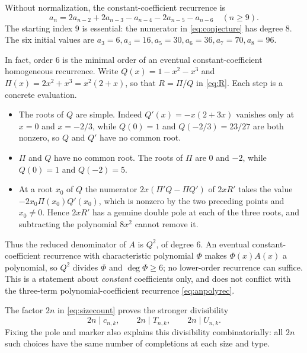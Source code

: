 \documentclass[11pt,letterpaper]{article}
\numberwithin{equation}{section}
\theoremstyle{definition}
\newcommand{\1}{\mathbf 1}
\begin{document}
Without normalization, the constant-coefficient recurrence is
\begin{equation}\label{eq:anrec}
 a_n=2a_{n-2}+2a_{n-3}-a_{n-4}-2a_{n-5}-a_{n-6}
 \quad(n\ge9).
\end{equation}
The starting index $9$ is essential: the numerator in \eqref{eq:conjecture}
has degree $8$. The six initial values are
$a_3=6,a_4=16,a_5=30,a_6=36,a_7=70,a_8=96$.

In fact, order $6$ is the minimal order of an eventual constant-coefficient
homogeneous recurrence. Write $Q(x)=1-x^2-x^3$ and $\Pi(x)=2x^2+x^3=x^2(2+x)$,
so that $R=\Pi/Q$ in \eqref{eq:R}. Each step is a concrete evaluation.
\begin{itemize}[leftmargin=1.6em,itemsep=1pt]
\item The roots of $Q$ are simple. Indeed $Q'(x)=-x(2+3x)$ vanishes only at
 $x=0$ and $x=-2/3$, while $Q(0)=1$ and $Q(-2/3)=23/27$ are both nonzero, so
 $Q$ and $Q'$ have no common root.
\item $\Pi$ and $Q$ have no common root. The roots of $\Pi$ are $0$ and $-2$,
 while $Q(0)=1$ and $Q(-2)=5$.
\item At a root $x_0$ of $Q$ the numerator $2x(\Pi'Q-\Pi Q')$ of $2xR'$ takes
 the value $-2x_0\Pi(x_0)Q'(x_0)$, which is nonzero by the two preceding points and
 $x_0\ne0$. Hence $2xR'$ has a genuine double pole at each of the three roots,
 and subtracting the polynomial $8x^2$ cannot remove it.
\end{itemize}
Thus the reduced denominator of $A$ is $Q^2$, of degree $6$. An eventual
constant-coefficient recurrence with characteristic polynomial $\Phi$ makes
$\Phi(x)A(x)$ a polynomial, so $Q^2$ divides $\Phi$ and $\deg\Phi\ge6$; no
lower-order recurrence can suffice. This is a statement about \emph{constant}
coefficients only, and does not conflict with the three-term
polynomial-coefficient recurrence \eqref{eq:anpolyrec}.

The factor $2n$ in \eqref{eq:sizecount} proves the stronger divisibility
\begin{equation}\label{eq:divisibility}
 2n\mid c_{n,k},\qquad 2n\mid T_{n,k},\qquad 2n\mid U_{n,k}.
\end{equation}
Fixing the pole and marker also explains this divisibility combinatorially:
all $2n$ such choices have the same number of completions at each size and type.
\end{document}
